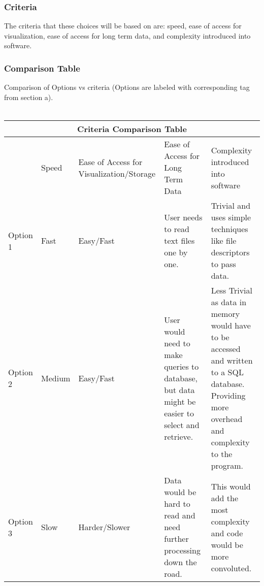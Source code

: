 \documentclass[10pt,draftclsnofoot,onecolumn]{IEEEtran}
\begin{document}
\subsubsection{Criteria}
The criteria that these choices will be based on are: speed, ease of access for visualization, ease of access for long term data, and complexity introduced into software.\\
\subsubsection{Comparison Table}
Comparison of Options vs criteria (Options are labeled with corresponding tag from section a). \\ \\
\begin{tabular}{ |p{2cm}|p{2cm}|p{2cm}| p{2cm}|p{2cm}|  }
\hline
\multicolumn{5}{|c|}{Criteria Comparison Table} \\
\hline
   &Speed&Ease of Access for Visualization/Storage&Ease of Access for Long Term Data&Complexity introduced into software\\
\hline
Option 1&Fast&Easy/Fast&User needs to read text files one by one.&Trivial and uses simple techniques like file descriptors to pass data. \\
\hline
Option 2&Medium&Easy/Fast&User would need to make queries to database, but data might be easier to select and retrieve.&Less Trivial as data in memory would have to be accessed and written to a SQL database. Providing more overhead and complexity to the program.\\
\hline
Option 3&Slow&Harder/Slower&Data would be hard to read and need further processing down the road.&This would add the most complexity and code would be more convoluted. \\
\hline
\end{tabular}
\vspace{1cm}
\end{document}
